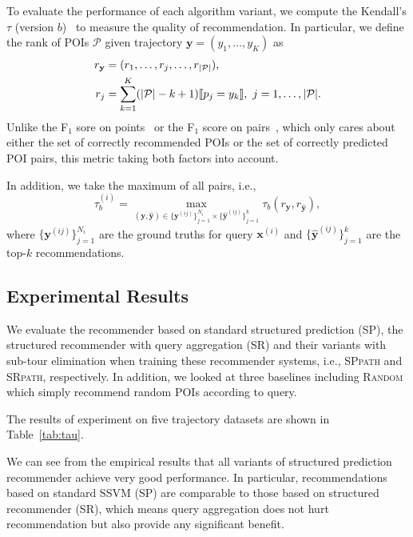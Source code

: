 To evaluate the performance of each algorithm variant, 
we compute the Kendall's $\tau$ (version $b$)~\cite{kendall1945,agresti2010analysis} to measure the quality of recommendation.
In particular,
we define the rank of POIs $\mathcal{P}$ given trajectory $\mathbf{y} = (y_1,\dots,y_K)$ as
\begin{align*} 
r_\mathbf{y} &= (r_1,\dots,r_j,\dots,r_{|\mathcal{P}|}), \\
r_j &= \sum_{k=1}^K (| \mathcal{P} | - k + 1)  \llbracket p_j = y_k \rrbracket, ~ j = 1, \dots, | \mathcal{P} |.
\end{align*}
Unlike the F$_1$ sore on points~\cite{ijcai15} or the F$_1$ score on pairs~\cite{cikm16paper}, 
which only cares about either the set of correctly recommended POIs or the set of correctly predicted POI pairs,
this metric taking both factors into account.

In addition, we take the maximum of all pairs,
i.e.,
\begin{equation*}
\tau_b^{(i)} = 
\max_{(\mathbf{y}, \hat{\mathbf{y}}) \in \{\mathbf{y}^{(ij)}\}_{j=1}^{N_i} \times \{\hat{\mathbf{y}}^{(ij)}\}_{j=1}^k} 
\tau_b(r_\mathbf{y}, r_{\hat{\mathbf{y}}}),
\end{equation*}
where $\{\mathbf{y}^{(ij)}\}_{j=1}^{N_i}$ are the ground truths for query $\mathbf{x}^{(i)}$ and
$\{\hat{\mathbf{y}}^{(ij)}\}_{j=1}^k$ are the top-$k$ recommendations.



\subsection{Experimental Results}
\label{sec:result}

We evaluate the recommender based on standard structured prediction (\textsc{SP}), 
the structured recommender with query aggregation (\textsc{SR}) and 
their variants with sub-tour elimination when training these recommender systems,
i.e., \textsc{SPpath} and \textsc{SRpath}, respectively.
In addition, we looked at three baselines including \textsc{Random} which simply recommend random POIs according to query.

The results of experiment on five trajectory datasets are shown in Table~\ref{tab:tau}.



We can see from the empirical results that all variants of structured prediction recommender achieve very good performance.
In particular, recommendations based on standard SSVM (\textsc{SP}) are comparable to those based on structured recommender (\textsc{SR}), 
which means query aggregation does not hurt recommendation but also provide any significant benefit.

